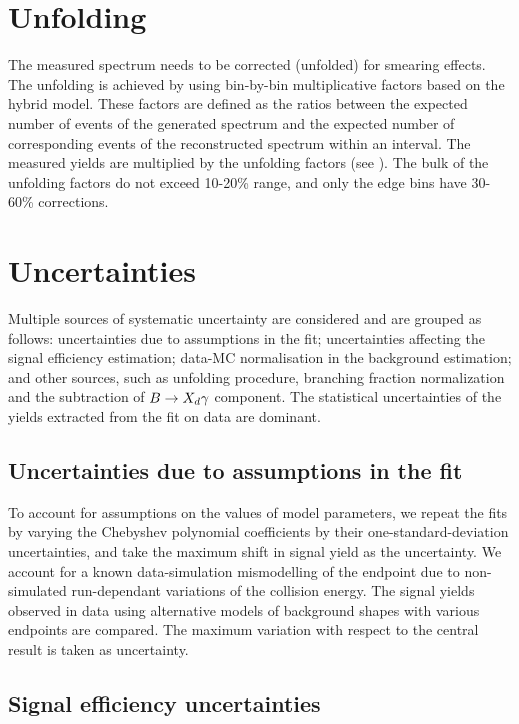 \section{Unfolding}\label{sec:unfolding}

The measured \BtoXsgamma spectrum needs to be corrected (unfolded) for smearing effects. The unfolding is achieved by using bin-by-bin multiplicative factors based on the hybrid model. These factors are defined as the ratios between the expected number of events of the generated spectrum and the expected number of corresponding events of the reconstructed spectrum within an \EB interval. The measured \BtoXsgamma yields are multiplied by the unfolding factors (see ). The bulk of the unfolding factors do not exceed 10-20\% range, and only the edge bins have 30-60\% corrections.

\section{Uncertainties}\label{sec:uncertainties}

Multiple sources of systematic uncertainty are considered and are grouped as follows: uncertainties due to assumptions in the fit; uncertainties affecting the signal efficiency estimation; data-MC normalisation in the background estimation; and other sources, such as unfolding procedure, branching fraction normalization and the subtraction of $B\rightarrow X_d \gamma$ component. The statistical uncertainties of the yields extracted from the fit on data are dominant.

\subsection{Uncertainties due to assumptions in the fit}\label{sec:data_uncertainty}

To account for assumptions on the values of model parameters, we repeat the fits by varying the Chebyshev polynomial coefficients by their one-standard-deviation uncertainties, and take the maximum shift in signal yield as the uncertainty. We account for a known data-simulation mismodelling of the \Mbc endpoint due to non-simulated run-dependant variations of the collision energy. The signal yields observed in data using alternative models of background shapes with various \Mbc endpoints are compared. The maximum variation with respect to the central result is taken as uncertainty.


\subsection{Signal efficiency uncertainties}\label{sec:signal_uncertainty}

